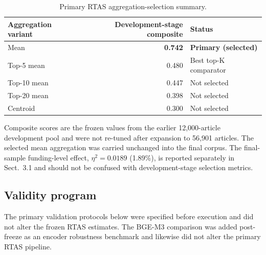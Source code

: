 \documentclass[11pt]{article}
\begin{document}
\begin{table}[H]
\centering
\caption{Primary RTAS aggregation-selection summary.}
\label{tab:selection}
\begin{threeparttable}
\begin{tabular}{lrl}
\toprule
Aggregation variant & Development-stage composite & Status\\
\midrule
Mean & \textbf{0.742} & \textbf{Primary (selected)}\\
Top-5 mean & 0.480 & Best top-K comparator\\
Top-10 mean & 0.447 & Not selected\\
Top-20 mean & 0.398 & Not selected\\
Centroid & 0.300 & Not selected\\
\bottomrule
\end{tabular}
\begin{tablenotes}\footnotesize
\item Composite scores are the frozen values from the earlier 12,000-article development pool and were not re-tuned after expansion to 56,901 articles. The selected mean aggregation was carried unchanged into the final corpus. The final-sample funding-level effect, $\eta^2=0.0189$ (1.89\%), is reported separately in Sect.~3.1 and should not be confused with development-stage selection metrics.
\end{tablenotes}
\end{threeparttable}
\end{table}

\subsection{Validity program}

The primary validation protocols below were specified before execution and did not alter the frozen RTAS estimates. The BGE-M3 comparison was added post-freeze as an encoder robustness benchmark and likewise did not alter the primary RTAS pipeline.
\end{document}
